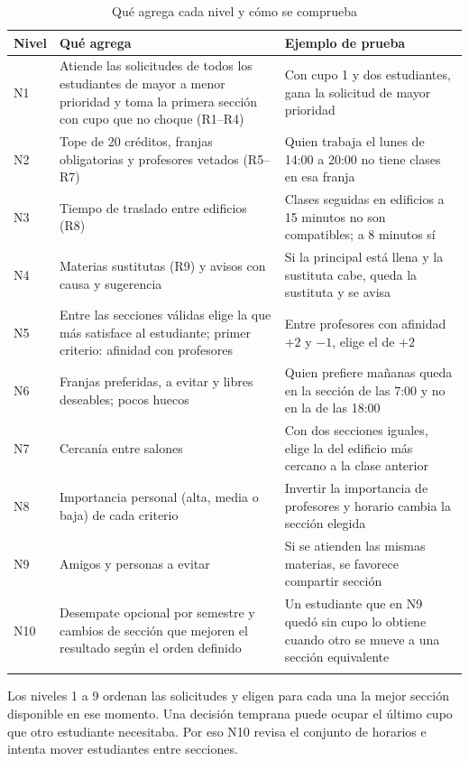 \documentclass[pdflatex,sn-mathphys-num]{sn-jnl}%
\begin{document}
\begin{table}[htbp]
\caption{Qué agrega cada nivel y cómo se comprueba}\label{tab:niveles}
\small
\begin{tabularx}{\textwidth}{@{}lLL@{}}
\toprule
Nivel & Qué agrega & Ejemplo de prueba \\
\midrule
N1 & Atiende las solicitudes de todos los estudiantes de mayor a menor prioridad y toma la primera sección con cupo que no choque (R1--R4) & Con cupo 1 y dos estudiantes, gana la solicitud de mayor prioridad \\
N2 & Tope de 20 créditos, franjas obligatorias y profesores vetados (R5--R7) & Quien trabaja el lunes de 14:00 a 20:00 no tiene clases en esa franja \\
N3 & Tiempo de traslado entre edificios (R8) & Clases seguidas en edificios a 15 minutos no son compatibles; a 8 minutos sí \\
N4 & Materias sustitutas (R9) y avisos con causa y sugerencia & Si la principal está llena y la sustituta cabe, queda la sustituta y se avisa \\
N5 & Entre las secciones válidas elige la que más satisface al estudiante; primer criterio: afinidad con profesores & Entre profesores con afinidad $+2$ y $-1$, elige el de $+2$ \\
N6 & Franjas preferidas, a evitar y libres deseables; pocos huecos & Quien prefiere mañanas queda en la sección de las 7:00 y no en la de las 18:00 \\
N7 & Cercanía entre salones & Con dos secciones iguales, elige la del edificio más cercano a la clase anterior \\
N8 & Importancia personal (alta, media o baja) de cada criterio & Invertir la importancia de profesores y horario cambia la sección elegida \\
N9 & Amigos y personas a evitar & Si se atienden las mismas materias, se favorece compartir sección \\
N10 & Desempate opcional por semestre y cambios de sección que mejoren el resultado según el orden definido & Un estudiante que en N9 quedó sin cupo lo obtiene cuando otro se mueve a una sección equivalente \\
\botrule
\end{tabularx}
\end{table}

Los niveles 1 a 9 ordenan las solicitudes y eligen para cada una la mejor sección disponible en ese momento. Una decisión temprana puede ocupar el último cupo que otro estudiante necesitaba. Por eso N10 revisa el conjunto de horarios e intenta mover estudiantes entre secciones.
\end{document}
